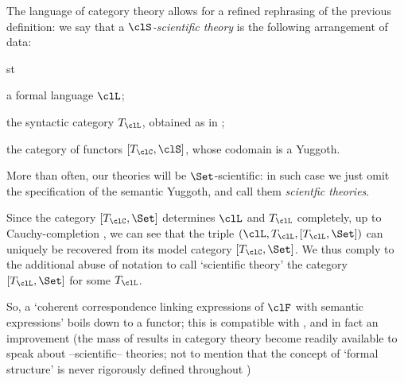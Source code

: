 The language of category theory allows for a refined rephrasing of the previous definition: we say that a \emph{$\clS$-scientific theory} is the following arrangement of data:
\begin{enumtag}{st}
	\item a formal language $\clL$;
	\item the syntactic category $T_\clL$, obtained as in \cite{lambek1988introduction};
	\item the category of functors $[T_\clC, \clS]$, whose codomain is a Yuggoth.
\end{enumtag}
More than often, our theories will be $\Set$-scientific: in such case we just omit the specification of the semantic Yuggoth, and call them \emph{scientfic theories}.

Since the category $[T_\clC, \Set]$ determines $\clL$ and $T_\clL$ completely, up to Cauchy-completion \cite{borceuso-cauchy}, we can see that the triple $(\clL, T_\clL, [T_\clL,\Set])$ can uniquely be recovered from its model category $[T_\clC, \Set]$. We thus comply to the additional abuse of notation to call `scientific theory' the category $[T_\clL,\Set]$ for some $T_\clL$.

So, a `coherent correspondence linking expressions of $\clF$ with semantic expressions' boils down to a functor; this is compatible with \cite[2.1]{biologia}, and in fact an improvement (the mass of results in category theory become readily available to speak about --scientific-- theories; not to mention that the concept of `formal structure' is never rigorously defined throughout \cite{biologia})
